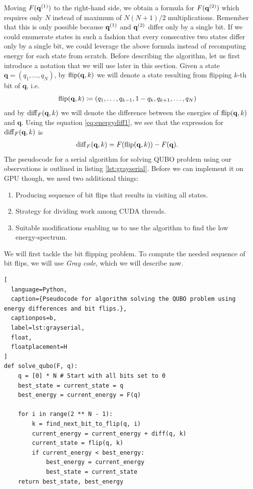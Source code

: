 Moving $F(\mathbf{q}^{(1)})$ to the right-hand side, we obtain a formula for $F(\mathbf{q}^{(2)})$
which requires only $N$ instead of maximum of $N(N+1)/2$ multiplications.
Remember that this is only possible because $\mathbf{q}^{(1)}$ and $\mathbf{q}^{(2)}$ differ only
by a single bit. If we could enumerate states in such a fashion that every
consecutive two states differ only by a single bit, we could leverage the above
formula instead of recomputing energy for each state from scratch. Before
describing the algorithm, let us first introduce a notation that we will use
later in this section. Given a state $\mathbf{q} = (q_{1},\ldots,q_{N})$, by
$\operatorname*{flip}(\mathbf{q},k)$ we will denote a state resulting from flipping $k$-th
bit of $\mathbf{q}$, i.e.
\begin{equation}
  \operatorname*{flip}(\mathbf{q},k) \coloneq (q_{1}, \ldots, q_{k-1}, 1-q_{k}, q_{k+1}, \ldots, q_{N})
\end{equation}
and by $\operatorname{diff}_{F}(\mathbf{q},k)$ we will denote the difference between the energies of $\operatorname*{flip}(\mathbf{q},k)$ and $\mathbf{q}$. Using the equation \eqref{eq:energydiff1}, we see that the expression for $\operatorname{diff}_{F}(\mathbf{q},k)$ is
\begin{align}
  \begin{split}
    \operatorname{diff}_{F}(\mathbf{q},k) = F(\operatorname*{flip}(\mathbf{q},k)) - F(\mathbf{q}).
  \end{split}
\end{align}
The pseudocode for a serial algorithm for solving QUBO problem using our observations is outlined in listing \ref{lst:grayserial}. Before we can implement it on GPU though, we need two additional things:
\begin{enumerate}
  \item Producing sequence of bit flips that results in visiting all states.
  \item Strategy for dividing work among CUDA threads.
  \item Suitable modifications enabling us to use the algorithm to find the low
    energy-spectrum.
\end{enumerate}
We will first tackle the bit flipping problem. To compute the needed sequence of bit flips, we will use \emph{Gray code}, which we will describe now.
\begin{lstlisting}[
  language=Python,
  caption={Pseudocode for algorithm solving the QUBO problem using energy differences and bit flips.},
  captionpos=b,
  label=lst:grayserial,
  float,
  floatplacement=H
]
def solve_qubo(F, q):
    q = [0] * N # Start with all bits set to 0
    best_state = current_state = q
    best_energy = current_energy = F(q)

    for i in range(2 ** N - 1):
        k = find_next_bit_to_flip(q, i)
        current_energy = current_energy + diff(q, k)
        current_state = flip(q, k)
        if current_energy < best_energy:
            best_energy = current_energy
            best_state = current_state
    return best_state, best_energy
\end{lstlisting}
